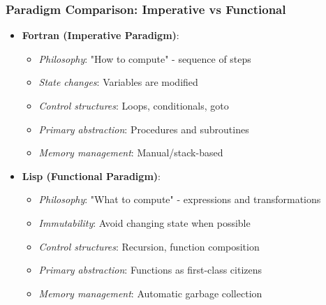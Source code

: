 \documentclass{beamer}
\begin{document}
\begin{frame}[t]
\frametitle{Paradigm Comparison: Imperative vs Functional}
\begin{itemize}
    \item \textbf{Fortran (Imperative Paradigm)}:
    \begin{itemize}
        \item \textit{Philosophy}: "How to compute" - sequence of steps
        \item \textit{State changes}: Variables are modified
        \item \textit{Control structures}: Loops, conditionals, goto
        \item \textit{Primary abstraction}: Procedures and subroutines
        \item \textit{Memory management}: Manual/stack-based
    \end{itemize}
    
    \item \textbf{Lisp (Functional Paradigm)}:
    \begin{itemize}
        \item \textit{Philosophy}: "What to compute" - expressions and transformations
        \item \textit{Immutability}: Avoid changing state when possible
        \item \textit{Control structures}: Recursion, function composition
        \item \textit{Primary abstraction}: Functions as first-class citizens
        \item \textit{Memory management}: Automatic garbage collection
    \end{itemize}
\end{itemize}
\end{frame}
\end{document}
